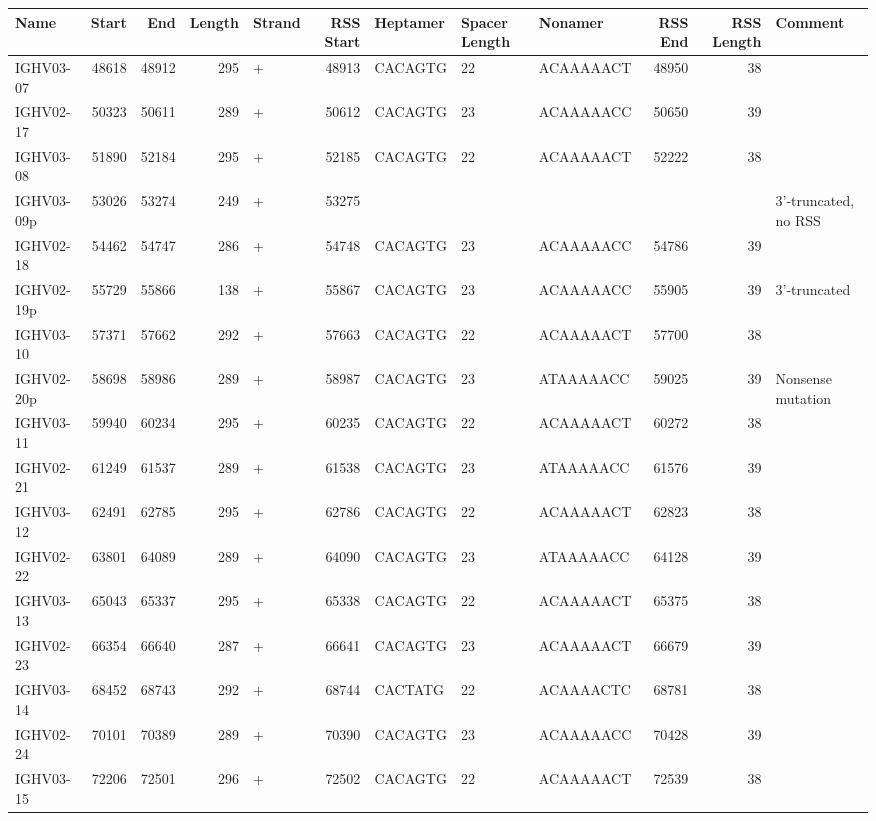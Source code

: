 \begin{tabular}{lrrrlrlllrrl}
  \toprule Name & Start & End & Length & Strand & RSS Start & Heptamer & Spacer Length & Nonamer & RSS End & RSS Length & Comment \\ 
  \midrule IGHV03-07 & 48618 & 48912 & 295 & + & 48913 & CACAGTG & 22 & ACAAAAACT & 48950 & 38 &  \\ 
  IGHV02-17 & 50323 & 50611 & 289 & + & 50612 & CACAGTG & 23 & ACAAAAACC & 50650 & 39 &  \\ 
  IGHV03-08 & 51890 & 52184 & 295 & + & 52185 & CACAGTG & 22 & ACAAAAACT & 52222 & 38 &  \\ 
  IGHV03-09p & 53026 & 53274 & 249 & + & 53275 &  &  &  &  &  & 3'-truncated, no RSS \\ 
  IGHV02-18 & 54462 & 54747 & 286 & + & 54748 & CACAGTG & 23 & ACAAAAACC & 54786 & 39 &  \\ 
  IGHV02-19p & 55729 & 55866 & 138 & + & 55867 & CACAGTG & 23 & ACAAAAACC & 55905 & 39 & 3'-truncated \\ 
  IGHV03-10 & 57371 & 57662 & 292 & + & 57663 & CACAGTG & 22 & ACAAAAACT & 57700 & 38 &  \\ 
  IGHV02-20p & 58698 & 58986 & 289 & + & 58987 & CACAGTG & 23 & ATAAAAACC & 59025 & 39 & Nonsense mutation \\ 
  IGHV03-11 & 59940 & 60234 & 295 & + & 60235 & CACAGTG & 22 & ACAAAAACT & 60272 & 38 &  \\ 
  IGHV02-21 & 61249 & 61537 & 289 & + & 61538 & CACAGTG & 23 & ATAAAAACC & 61576 & 39 &  \\ 
  IGHV03-12 & 62491 & 62785 & 295 & + & 62786 & CACAGTG & 22 & ACAAAAACT & 62823 & 38 &  \\ 
  IGHV02-22 & 63801 & 64089 & 289 & + & 64090 & CACAGTG & 23 & ATAAAAACC & 64128 & 39 &  \\ 
  IGHV03-13 & 65043 & 65337 & 295 & + & 65338 & CACAGTG & 22 & ACAAAAACT & 65375 & 38 &  \\ 
  IGHV02-23 & 66354 & 66640 & 287 & + & 66641 & CACAGTG & 23 & ACAAAAACT & 66679 & 39 &  \\ 
  IGHV03-14 & 68452 & 68743 & 292 & + & 68744 & CACTATG & 22 & ACAAAACTC & 68781 & 38 &  \\ 
  IGHV02-24 & 70101 & 70389 & 289 & + & 70390 & CACAGTG & 23 & ACAAAAACC & 70428 & 39 &  \\ 
  IGHV03-15 & 72206 & 72501 & 296 & + & 72502 & CACAGTG & 22 & ACAAAAACT & 72539 & 38 &  \\ 

\end{tabular}
